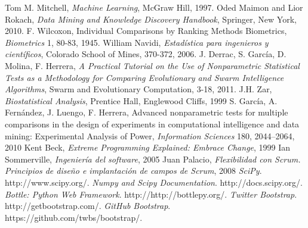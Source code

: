 
\begin{thebibliography}{99}
 Tom M. Mitchell, \textit{Machine Learning}, McGraw Hill, 1997.
 Oded Maimon and Lior Rokach, \textit{Data Mining and Knowledge Discovery Handbook}, Springer, New York, 2010.
 F. Wilcoxon, Individual Comparisons by Ranking Methods Biometrics, \textit{Biometrics} 1, 80-83, 1945.
 William Navidi, \textit{Estadística para ingenieros y científicos}, Colorado School of Mines, 370-372, 2006.
 J. Derrac, S. García, D. Molina, F. Herrera, \textit{A Practical Tutorial on the Use of Nonparametric Statistical Tests as a Methodology for Comparing Evolutionary and Swarm Intelligence Algorithms}, Swarm and Evolutionary Computation, 3-18, 2011.
 J.H. Zar, \textit{Biostatistical Analysis}, Prentice Hall, Englewood Cliffs, 1999
 S. García, A. Fernández, J. Luengo, F. Herrera, Advanced nonparametric tests for multiple comparisons in the design of experiments in computational intelligence and data mining: Experimental Analysis of Power, \textit{Information Sciences} 180, 2044–2064, 2010
 Kent Beck, \textit{Extreme Programming Explained: Embrace Change}, 1999
 Ian Sommerville, \textit{Ingeniería del software}, 2005
 Juan Palacio, \textit{Flexibilidad con Scrum. Principios de diseño e implantación de campos de Scrum}, 2008
 \textit{SciPy}. http://www.scipy.org/.
 \textit{Numpy and Scipy Documentation}. http://docs.scipy.org/.
 \textit{Bottle: Python Web Framework}. http://http://bottlepy.org/.
 \textit{Twitter Bootstrap}. http://getbootstrap.com/.
 \textit{GitHub Bootstrap}. https://github.com/twbs/bootstrap/.
\end{thebibliography}